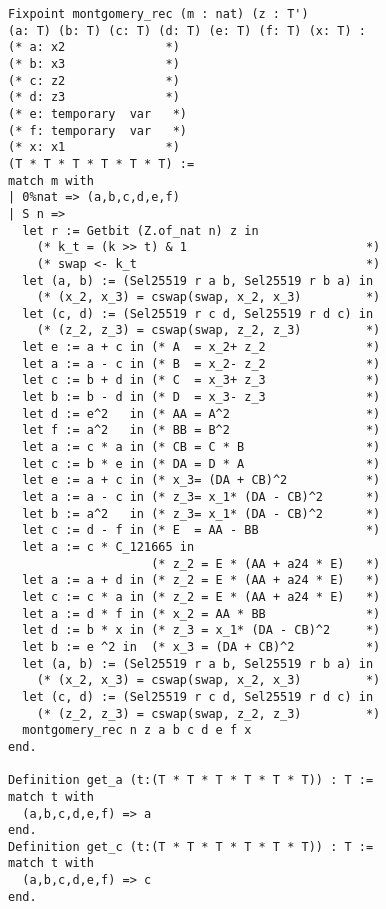 \begin{lstlisting}[language=Coq]
Fixpoint montgomery_rec (m : nat) (z : T')
(a: T) (b: T) (c: T) (d: T) (e: T) (f: T) (x: T) :
(* a: x2              *)
(* b: x3              *)
(* c: z2              *)
(* d: z3              *)
(* e: temporary  var   *)
(* f: temporary  var   *)
(* x: x1              *)
(T * T * T * T * T * T) :=
match m with
| 0%nat => (a,b,c,d,e,f)
| S n =>
  let r := Getbit (Z.of_nat n) z in
    (* k_t = (k >> t) & 1                         *)
    (* swap <- k_t                                *)
  let (a, b) := (Sel25519 r a b, Sel25519 r b a) in
    (* (x_2, x_3) = cswap(swap, x_2, x_3)         *)
  let (c, d) := (Sel25519 r c d, Sel25519 r d c) in
    (* (z_2, z_3) = cswap(swap, z_2, z_3)         *)
  let e := a + c in (* A  = x_2+ z_2              *)
  let a := a - c in (* B  = x_2- z_2              *)
  let c := b + d in (* C  = x_3+ z_3              *)
  let b := b - d in (* D  = x_3- z_3              *)
  let d := e^2   in (* AA = A^2                   *)
  let f := a^2   in (* BB = B^2                   *)
  let a := c * a in (* CB = C * B                 *)
  let c := b * e in (* DA = D * A                 *)
  let e := a + c in (* x_3= (DA + CB)^2           *)
  let a := a - c in (* z_3= x_1* (DA - CB)^2      *)
  let b := a^2   in (* z_3= x_1* (DA - CB)^2      *)
  let c := d - f in (* E  = AA - BB               *)
  let a := c * C_121665 in
                    (* z_2 = E * (AA + a24 * E)   *)
  let a := a + d in (* z_2 = E * (AA + a24 * E)   *)
  let c := c * a in (* z_2 = E * (AA + a24 * E)   *)
  let a := d * f in (* x_2 = AA * BB              *)
  let d := b * x in (* z_3 = x_1* (DA - CB)^2     *)
  let b := e ^2 in  (* x_3 = (DA + CB)^2          *)
  let (a, b) := (Sel25519 r a b, Sel25519 r b a) in
    (* (x_2, x_3) = cswap(swap, x_2, x_3)         *)
  let (c, d) := (Sel25519 r c d, Sel25519 r d c) in
    (* (z_2, z_3) = cswap(swap, z_2, z_3)         *)
  montgomery_rec n z a b c d e f x
end.

Definition get_a (t:(T * T * T * T * T * T)) : T :=
match t with
  (a,b,c,d,e,f) => a
end.
Definition get_c (t:(T * T * T * T * T * T)) : T :=
match t with
  (a,b,c,d,e,f) => c
end.
\end{lstlisting}

